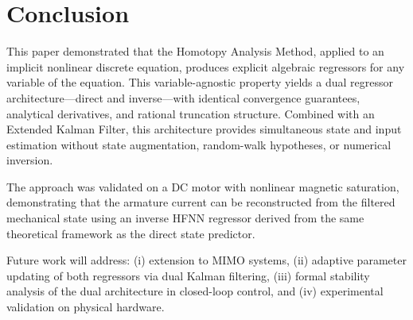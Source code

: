 \documentclass[lettersize,journal]{IEEEtran}
\begin{document}
\section{Conclusion}
\label{sec:conclusion}

This paper demonstrated that the Homotopy Analysis Method, applied to an implicit nonlinear discrete equation, produces explicit algebraic regressors for any variable of the equation. This variable-agnostic property yields a dual regressor architecture---direct and inverse---with identical convergence guarantees, analytical derivatives, and rational truncation structure. Combined with an Extended Kalman Filter, this architecture provides simultaneous state and input estimation without state augmentation, random-walk hypotheses, or numerical inversion.

The approach was validated on a DC motor with nonlinear magnetic saturation, demonstrating that the armature current can be reconstructed from the filtered mechanical state using an inverse HFNN regressor derived from the same theoretical framework as the direct state predictor.

Future work will address: (i) extension to MIMO systems, (ii) adaptive parameter updating of both regressors via dual Kalman filtering, (iii) formal stability analysis of the dual architecture in closed-loop control, and (iv) experimental validation on physical hardware.
\end{document}
